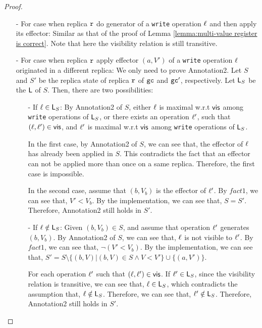 \begin {proof}
\begin{itemize}
\setlength{\itemsep}{0.5pt}
\item[-] For case when replica $\mathtt{r}$ do generator of a {\tt write} operation $\ell$ and then apply its effector: Similar as that of the proof of Lemma \ref{lemma:multi-value register is correct}. Note that here the visibility relation is still transitive.

\item[-] For case when replica $\mathtt{r}$ apply effector $(a,V')$ of a {\tt write} operation $\ell$ originated in a different replica: We only need to prove Annotation2. Let $S$ and $S'$ be the replica state of replica $\mathtt{r}$ of $\mathtt{gc}$ and $\mathtt{gc}'$, respectively. Let $\mathsf{L}_S$ be the $\mathsf{L}$ of $S$. Then, there are two possibilities:

    \begin{itemize}
    \setlength{\itemsep}{0.5pt}
    \item[-] If $\ell \in \mathsf{L}_S$: By Annotation2 of $S$, either $\ell$ is maximal w.r.t $\mathsf{vis}$ among {\tt write} operations of $\mathsf{L}_S$, or there exists an operation $\ell'$, such that $(\ell,\ell') \in \mathsf{vis}$, and $\ell'$ is maximal w.r.t $\mathsf{vis}$ among {\tt write} operations of $\mathsf{L}_S$.

        In the first case, by Annotation2 of $S$, we can see that, the effector of $\ell$ has already been applied in $S$. This contradicts the fact that an effector can not be applied more than once on a same replica. Therefore, the first case is impossible.

        In the second case, assume that $(b,V_b)$ is the effector of $\ell'$. By $fact1$, we can see that, $V' < V_b$. By the implementation, we can see that, $S = S'$. Therefore, Annotation2 still holds in $S'$.

    \item[-] If $\ell \notin \mathsf{L}_S$: Given $(b,V_b) \in S$, and assume that operation $\ell'$ generates $(b,V_b)$. By Annotation2 of $S$, we can see that, $\ell$ is not visible to $\ell'$. By $fact1$, we can see that, $\neg (V' < V_b)$. By the implementation, we can see that, $S' = S \setminus \{ (b,V) \vert (b,V) \in S \wedge V < V' \} \cup \{ (a,V') \}$.

        For each operation $\ell'$ such that $(\ell,\ell') \in \mathsf{vis}$. If $\ell' \in \mathsf{L}_S$, since the visibility relation is transitive, we can see that, $\ell \in \mathsf{L}_S$, which contradicts the assumption that, $\ell \notin \mathsf{L}_S$. Therefore, we can see that, $\ell' \notin \mathsf{L}_S$. Therefore, Annotation2 still holds in $S'$.
    \end{itemize}
\end{itemize}


\end{proof}
